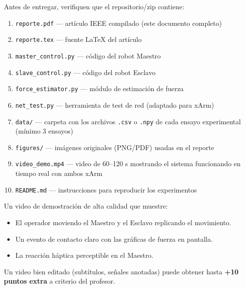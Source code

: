 \documentclass[journal,10pt,twoside]{IEEEtran}
\begin{document}
\begin{todobox}
  Antes de entregar, verifiquen que el repositorio/zip contiene:
  \begin{enumerate}[label=$\square$, itemsep=0.3em]
    \item \texttt{reporte.pdf} — artículo IEEE compilado (este documento completo)
    \item \texttt{reporte.tex} — fuente LaTeX del artículo
    \item \texttt{master\_control.py} — código del robot Maestro
    \item \texttt{slave\_control.py} — código del robot Esclavo
    \item \texttt{force\_estimator.py} — módulo de estimación de fuerza
    \item \texttt{net\_test.py} — herramienta de test de red (adaptado para xArm)
    \item \texttt{data/} — carpeta con los archivos \texttt{.csv} o \texttt{.npy}
          de cada ensayo experimental (mínimo 3 ensayos)
    \item \texttt{figures/} — imágenes originales (PNG/PDF) usadas en el reporte
    \item \texttt{video\_demo.mp4} — video de 60--120 s mostrando el sistema
          funcionando en tiempo real con ambos xArm
    \item \texttt{README.md} — instrucciones para reproducir los experimentos
  \end{enumerate}
\end{todobox}

\begin{rubricbox}
  Un video de demostración de alta calidad que muestre:
  \begin{itemize}[itemsep=0.2em]
    \item El operador moviendo el Maestro y el Esclavo replicando el movimiento.
    \item Un evento de contacto claro con las gráficas de fuerza en pantalla.
    \item La reacción háptica perceptible en el Maestro.
  \end{itemize}
  Un video bien editado (subtítulos, señales anotadas) puede obtener
  hasta \textbf{+10 puntos extra} a criterio del profesor.
\end{rubricbox}
\end{document}
